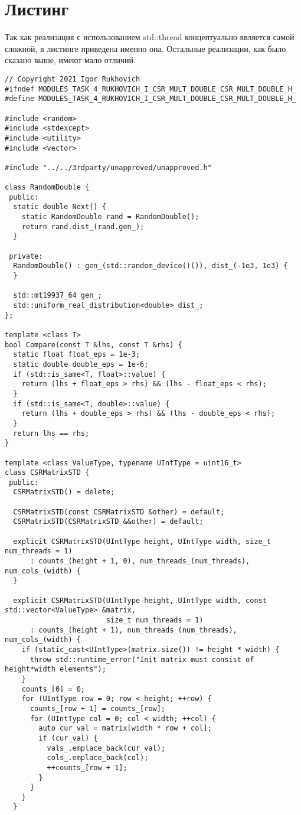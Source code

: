 \documentclass{report}
\begin{document}
\section*{Листинг}

\par Так как реализация с использованием std::thread концептуально является самой сложной, в листинге приведена именно она. Остальные реализации, как было сказано выше, имеют мало отличий. 

\begin{lstlisting}
// Copyright 2021 Igor Rukhovich
#ifndef MODULES_TASK_4_RUKHOVICH_I_CSR_MULT_DOUBLE_CSR_MULT_DOUBLE_H_
#define MODULES_TASK_4_RUKHOVICH_I_CSR_MULT_DOUBLE_CSR_MULT_DOUBLE_H_

#include <random>
#include <stdexcept>
#include <utility>
#include <vector>

#include "../../3rdparty/unapproved/unapproved.h"

class RandomDouble {
 public:
  static double Next() {
    static RandomDouble rand = RandomDouble();
    return rand.dist_(rand.gen_);
  }

 private:
  RandomDouble() : gen_(std::random_device()()), dist_(-1e3, 1e3) {
  }

  std::mt19937_64 gen_;
  std::uniform_real_distribution<double> dist_;
};

template <class T>
bool Compare(const T &lhs, const T &rhs) {
  static float float_eps = 1e-3;
  static double double_eps = 1e-6;
  if (std::is_same<T, float>::value) {
    return (lhs + float_eps > rhs) && (lhs - float_eps < rhs);
  }
  if (std::is_same<T, double>::value) {
    return (lhs + double_eps > rhs) && (lhs - double_eps < rhs);
  }
  return lhs == rhs;
}

template <class ValueType, typename UIntType = uint16_t>
class CSRMatrixSTD {
 public:
  CSRMatrixSTD() = delete;

  CSRMatrixSTD(const CSRMatrixSTD &other) = default;
  CSRMatrixSTD(CSRMatrixSTD &&other) = default;

  explicit CSRMatrixSTD(UIntType height, UIntType width, size_t num_threads = 1)
      : counts_(height + 1, 0), num_threads_(num_threads), num_cols_(width) {
  }

  explicit CSRMatrixSTD(UIntType height, UIntType width, const std::vector<ValueType> &matrix,
                        size_t num_threads = 1)
      : counts_(height + 1), num_threads_(num_threads), num_cols_(width) {
    if (static_cast<UIntType>(matrix.size()) != height * width) {
      throw std::runtime_error("Init matrix must consist of height*width elements");
    }
    counts_[0] = 0;
    for (UIntType row = 0; row < height; ++row) {
      counts_[row + 1] = counts_[row];
      for (UIntType col = 0; col < width; ++col) {
        auto cur_val = matrix[width * row + col];
        if (cur_val) {
          vals_.emplace_back(cur_val);
          cols_.emplace_back(col);
          ++counts_[row + 1];
        }
      }
    }
  }


\end{lstlisting}
\end{document}
